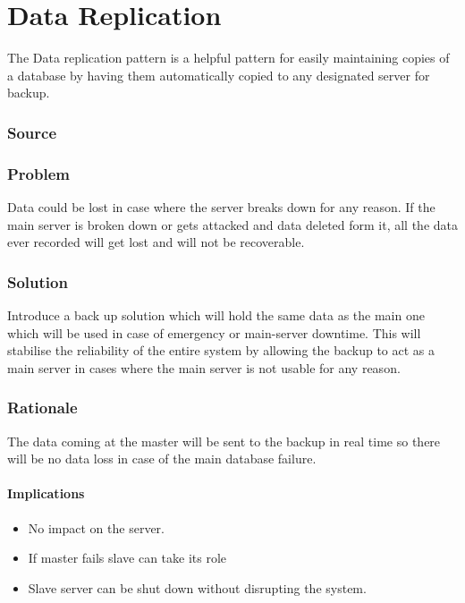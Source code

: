 
\section{Data Replication}

	The Data replication pattern is a helpful pattern for easily maintaining copies of a database by having them automatically copied to any designated server for backup.  


	\subsubsection{Source} \cite{book:design-patterns}

	\subsubsection{Problem}

	Data could be lost in case where the server breaks down for any reason. If the main server is broken down or gets attacked and data deleted form it, all the data ever recorded will get lost and will not be recoverable. 

	\subsubsection{Solution} 

	Introduce a back up solution which will hold the same data as the main one which will be used in case of emergency or main-server downtime. This will stabilise the reliability of the entire system by allowing the backup to act as a main server in cases where the main server is not usable for any reason.

	\subsubsection{Rationale}
	The data coming at the master will be sent to the backup in real time so there will be no data loss in case of the main database failure.

\paragraph{Implications}
\begin{itemize}
	\item No impact on the server.
	\item If master fails slave can take its role
	\item Slave server can be shut down without disrupting the system.
\end{itemize}
